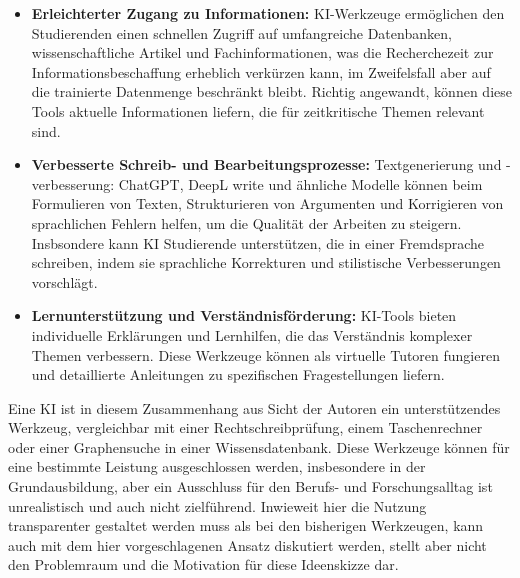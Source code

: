 \documentclass[conference]{IEEEtran}
\begin{document}
\begin{itemize}[leftmargin=*]
    \item \textbf{Erleichterter Zugang zu Informationen:}
    \newline KI-Werkzeuge ermöglichen den Studierenden einen schnellen Zugriff auf umfangreiche Datenbanken, wissenschaftliche Artikel und Fachinformationen, was die Recherchezeit zur Informationsbeschaffung erheblich verkürzen kann, im Zweifelsfall aber auf die trainierte Datenmenge beschränkt bleibt.
    \newline Richtig angewandt, können diese Tools  aktuelle Informationen liefern, die für zeitkritische Themen relevant sind.

    \item \textbf{Verbesserte Schreib- und Bearbeitungsprozesse:}
    \newline Textgenerierung und -verbesserung: ChatGPT, DeepL write und ähnliche Modelle können beim Formulieren von Texten, Strukturieren von Argumenten und Korrigieren von sprachlichen Fehlern helfen, um  die Qualität der Arbeiten zu steigern.
    \newline Insbsondere kann  KI  Studierende unterstützen, die in einer Fremdsprache schreiben, indem sie sprachliche Korrekturen und stilistische Verbesserungen vorschlägt.

    \item \textbf{Lernunterstützung und Verständnisförderung:}
    \newline KI-Tools bieten individuelle Erklärungen und Lernhilfen, die das Verständnis komplexer Themen verbessern.
    \newline Diese Werkzeuge können als virtuelle Tutoren fungieren und detaillierte Anleitungen zu spezifischen Fragestellungen liefern.
\end{itemize}

Eine KI ist in diesem Zusammenhang aus Sicht der Autoren ein unterstützendes Werkzeug, vergleichbar mit einer Rechtschreibprüfung, einem Taschenrechner oder einer Graphensuche in einer Wissensdatenbank. Diese Werkzeuge können für eine bestimmte Leistung ausgeschlossen werden, insbesondere in der Grundausbildung, aber ein Ausschluss für den Berufs- und Forschungsalltag ist unrealistisch und auch nicht zielführend. Inwieweit hier die Nutzung transparenter gestaltet werden muss als bei den bisherigen Werkzeugen, kann auch mit dem hier vorgeschlagenen Ansatz diskutiert werden, stellt aber nicht den Problemraum und die Motivation für diese Ideenskizze dar.
\end{document}
